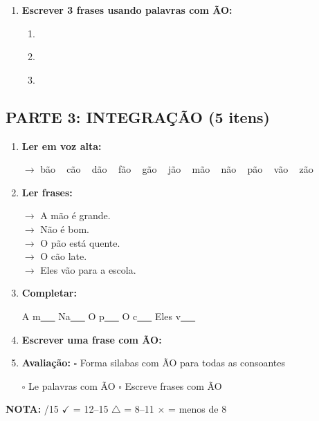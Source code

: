 \begin{exercicio}
\begin{enumerate}[resume]
  \item \textbf{Escrever 3 frases usando palavras com ÃO:}
  \begin{enumerate}[label=\alph*)]
    \item \underline{\hspace{8cm}}
    \item \underline{\hspace{8cm}}
    \item \underline{\hspace{8cm}}
  \end{enumerate}
\end{enumerate}

\subsection*{PARTE 3: INTEGRAÇÃO (5 itens)}

\begin{enumerate}[resume]
  \item \textbf{Ler em voz alta:}
  \begin{center}
  $\rightarrow$ bão  ~  cão  ~  dão  ~  fão  ~  gão  ~  jão  ~  mão  ~  não  ~  pão  ~  vão  ~  zão
  \end{center}

  \item \textbf{Ler frases:}
  \begin{center}
  $\rightarrow$ A mão é grande.\\
  $\rightarrow$ Não é bom.\\
  $\rightarrow$ O pão está quente.\\
  $\rightarrow$ O cão late.\\
  $\rightarrow$ Eles vão para a escola.
  \end{center}

  \item \textbf{Completar:}
  \begin{center}
  A m\underline{~~~} \quad Na\underline{~~~} \quad O p\underline{~~~} \quad O c\underline{~~~} \quad Eles v\underline{~~~}
  \end{center}

  \item \textbf{Escrever uma frase com ÃO:}
  \begin{center}
  \underline{\hspace{12cm}}
  \end{center}

  \item \textbf{Avaliação:} $\square$ Forma silabas com ÃO para todas as consoantes
  \begin{center}
  $\square$ Le palavras com ÃO \quad $\square$ Escreve frases com ÃO
  \end{center}
\end{enumerate}

\noindent\textbf{NOTA:} \underline{\hspace{1cm}}/15 \quad $\checkmark$ = 12--15 \quad $\triangle$ = 8--11 \quad $\times$ = menos de 8
\end{exercicio}

